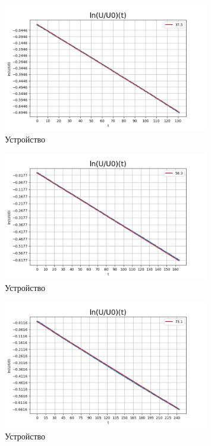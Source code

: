 \documentclass[a4paper]{article}
\begin{document}
\begin{figure}
    \centering
    \includegraphics[width=0.8\textwidth]{37_5.png}
    \caption{Устройство}
\end{figure}
 

\begin{figure}
    \centering
    \includegraphics[width=0.8\textwidth]{56_3.png}
    \caption{Устройство}
\end{figure}

\begin{figure}
    \centering
    \includegraphics[width=0.8\textwidth]{73_1.png}
    \caption{Устройство}
\end{figure}
\end{document}
